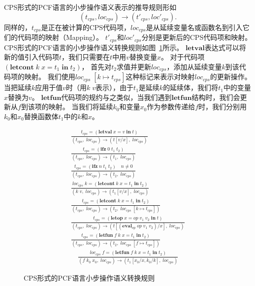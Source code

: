 CPS形式的PCF语言的小步操作语义表示的推导规则形如
\begin{equation}
(t_{cps},loc_{cps})\rightarrow(t'_{cps},loc'_{cps}).
\end{equation}
同样的，$t_{cps}$是正在被计算的CPS代码项，$loc_{cps}$是从延续变量名或函数名到引入它们的代码项的映射（Mapping）。
$t'_{cps}$和$loc'_{cps}$分别是更新后的CPS代码项和映射。
CPS形式的PCF语言的小步操作语义转换规则如图~\ref{cpsopsem}所示。
$\mathbf{letval}$表达式可以将新的值引入代码项$t$，我们只需要在$t$中用$v$替换变量$x$。
对于代码项$(\mathbf{letcont}\; k\; x=t_1\; \mathbf{in}\; t_2)$，
首先对$t_2$求值并更新$loc_{cps}$，添加从延续变量$k$到该代码项的映射。
我们使用$loc_{cps}\; [k\mapsto t_{cps}]$这种标记来表示对映射$loc_{cps}$的更新操作。
当把延续$k$应用于值$v$时（用$k\; v$表示），由于$t_1$是延续$k$的延续体，我们将$t_1$中的变量$x$替换为$v$。
$\mathbf{letfun}$代码项的规约与之类似，当我们遇到$\mathbf{letfun}$结构时，我们会更新从$f$到该项的映射。
当我们将延续$k_0$和变量$x_0$作为参数传递给$f$时，我们分别用$k_0$和$x_0$替换函数体$t_1$中的$k$和$x$。

\begin{figure}[htbp]
    \centering
    \setlength{\jot}{10pt}
    \centering
    \begin{gather*}
        \tag*{cs\_val} \displaystyle{\frac{t_{cps}=(\mathbf{letval}\; x=v\; \mathbf{in}\; t)} {(t_{cps},\; loc_{cps})\rightarrow (t [v/x],\; loc_{cps})}} \\
        \tag*{cs\_if\_zero} \displaystyle{\frac{t_{cps}=(\mathbf{ifz}\; 0\; t_1\; t_2)} {(t_{cps},\; loc_{cps})\rightarrow (t_1,\; loc_{cps})}} \\
        \tag*{cs\_if\_notzero} \displaystyle{\frac{t_{cps}=(\mathbf{ifz}\; n\; t_1\; t_2)\quad n \neq 0} {(t_{cps},\; loc_{cps})\rightarrow (t_2,\; loc_{cps})}} \\
        \tag*{cs\_cont\_app} \displaystyle{\frac{loc_{cps}\; k = (\mathbf{letcont}\; k\; x=t_1\; \mathbf{in}\; t_2)}{(k\; v,\; loc_{cps})\rightarrow (t_1 [v/x],\; loc_{cps})}} \\
        \tag*{cs\_cont} \displaystyle{\frac{t_{cps}=(\mathbf{letcont}\; k\; x=t_1\; \mathbf{in}\; t_2)} {(t_{cps},\; loc_{cps})\rightarrow (t_2,\; loc_{cps}\; [k\mapsto t_{cps}])}} \\
        \tag*{cs\_letop} \displaystyle{\frac{t_{cps}=(\mathbf{letop}\; x=op\; v_1\; v_2\; \mathbf{in}\; t)}{(t_{cps},\; loc_{cps})\rightarrow (t [(\mathbf{eval}_{op}\; op\; v_1\; v_2)/x],\; loc_{cps})}} \\
        \tag*{cs\_fun} \displaystyle{\frac{t_{cps}=(\mathbf{letfun}\; f\; k\; x=t_1\; \mathbf{in}\; t_2)} {(t_{cps},\; loc_{cps})\rightarrow (t_2,\; loc_{cps}\; [f\mapsto t_{cps}])}} \\
        \tag*{cs\_fun\_app} \quad \displaystyle{\frac{loc_{cps}\; f = (\mathbf{letfun}\; f\; k\; x=t_1\; \mathbf{in}\; t_2)}{(f\; k_0\; x_0,\; loc_{cps})\rightarrow (t_1 [x_0/x, k_0/k],\; loc_{cps})}}
    \end{gather*}   
    \caption{CPS形式的PCF语言小步操作语义转换规则}\label{cpsopsem}
\end{figure}

